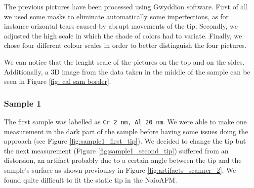 \documentclass[11pt,a4paper]{article}
\begin{document}
The previous pictures have been processed using Gwyddion software. First of all we used some masks to eliminate automatically some imperfections, as for instance orizontal tears caused by abrupt movements of the tip. Secondly, we adjusted the high scale in which the shade of colors had to variate. Finally, we chose four different colour scales in order to better distinguish the four pictures.

We can notice that the lenght scale of the pictures on the top and on the sides. Additionally, a 3D image from the data taken in the middle of the sample can be seen in Figure \ref{fig: cal sam border}.

\subsubsection{Sample 1}
The first sample was labelled as \texttt{Cr \SI{2}{\nano m}, Al \SI{20}{\nano m}}. We were able to make one measurement in the dark part of the sample before having some issues doing the approach (see Figure \ref{fig:sample1_first_tip}). We decided to change the tip but the next measurement (Figure \ref{fig:sample1_second_tip}) suffered from an distorsion, an artifact probably due to a certain angle between the tip and the sample's surface as shown previoulsy in Figure \ref{fig:artifacts_scanner_2}. We found quite difficult to fit the static tip in the NaioAFM.
\end{document}
